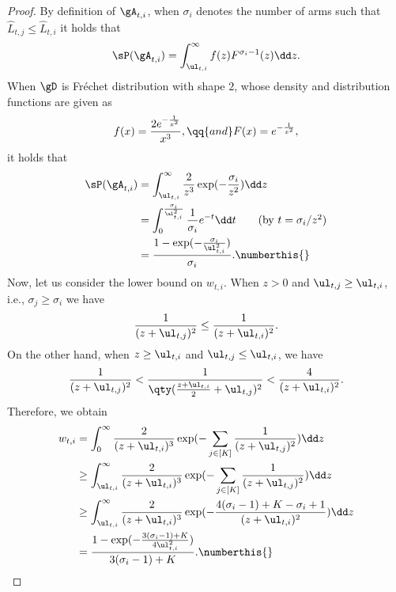 \begin{proof}
    By definition of $\gA_{t,i}$, when $\sigma_i$ denotes the number of arms such that $\hat{L}_{t,j} \leq \hat{L}_{t,i}$ it holds that
    \begin{equation*}
        \sP(\gA_{t,i}) = \int_{\ul_{t,i}}^\infty f(z) F^{\sigma_i - 1}(z) \dd z.
    \end{equation*}
    When $\gD$ is
Fr\'{e}chet distribution with shape $2$, whose density and distribution functions are given as
    \begin{equation}\label{eq: Frechet density}
        f(x) = \frac{2 e^{-\frac{1}{x^2}}}{x^3}, \qq{and} F(x) = e^{-\frac{1}{x^2}},
    \end{equation}
    it holds that
    \begin{align*}
        \sP(\gA_{t,i}) &= \int_{\ul_{t,i}}^\infty \frac{2}{z^{3}}\exp(-\frac{\sigma_i}{z^2} ) \dd z \\
        &= \int_0^{\frac{\sigma_i}{\ul_{t,i}^2}} \frac{1}{\sigma_i} e^{-t} \dd t \tag{by $t=\sigma_i/z^2$} \\
        &= \frac{1-\exp(-\frac{\sigma_i}{\ul_{t,i}^2})}{\sigma_i}. \numberthis{\label{eq: expression of prob. A}}
    \end{align*}
Now,
let us consider the lower bound on $w_{t,i}$.
    When $z>0$ and $\ul_{t,j} \geq \ul_{t,i}$, i.e., $\sigma_j \geq \sigma_i$ we have
    \begin{equation*}
        \frac{1}{(z+\ul_{t,j})^2} \leq \frac{1}{(z+\ul_{t,i})^2}.
    \end{equation*}
    On the other hand, when $z \geq \ul_{t,i}$ and $\ul_{t,j} \leq \ul_{t,i}$, we have
    \begin{equation*}
        \frac{1}{(z+\ul_{t,j})^2} < \frac{1}{\qty(\frac{z+\ul_{t,i}}{2}+\ul_{t,j})^2} < \frac{4}{(z+\ul_{t,i})^2}.
    \end{equation*}
    Therefore, we obtain
    \begin{align*}
        w_{t,i} &= \int_0^\infty \frac{2}{(z+\ul_{t,i})^3} \exp(-\sum_{j \in [K]} \frac{1}{(z+\ul_{t,j})^2}) \dd z \\
        &\geq \int_{\ul_{t,i}}^\infty \frac{2}{(z+\ul_{t,i})^3} \exp(-\sum_{j \in [K]} \frac{1}{(z+\ul_{t,j})^2}) \dd z \\
        &\geq \int_{\ul_{t,i}}^\infty \frac{2}{(z+\ul_{t,i})^3} \exp(- \frac{4(\sigma_i-1) + K-\sigma_i +1}{(z+\ul_{t,i})^2}) \dd z  \\
        &= \frac{1-\exp(-\frac{3(\sigma_i -1)+K}{4\ul_{t,i}^2})}{3(\sigma_i-1)+K}. \numberthis{\label{eq: lower bound on w}}
    \end{align*}

\end{proof}
